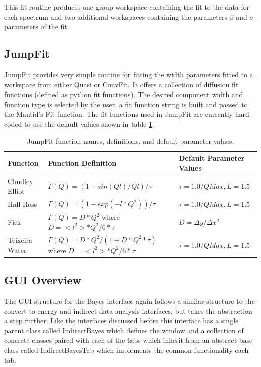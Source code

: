 \documentclass[paper=a4, fontsize=11pt]{scrartcl}	%
\numberwithin{equation}{section}															%
\numberwithin{figure}{section}																%
\numberwithin{table}{section}																%
\begin{document}
This fit routine produces one group workspace containing the fit to the data for each spectrum and two additional workspaces containing the parameters $\beta$ and $\sigma$ parameters of the fit.

\subsection{JumpFit}
\label{subsec:jumpfit}
JumpFit provides very simple routine for fitting the width parameters fitted to a workspace from either Quasi or ConvFit. It offers a collection of diffusion fit functions (defined as python fit functions). The desired component width and function type is selected by the user, a fit function string is built and passed to the Mantid's Fit function. The fit functions used in JumpFit are currently hard coded to use the default values shown in table \ref{table:jumpfit-functions}.

\begin{table}[H]
\begin{center}
\begin{tabular}{ l l l}
Function & Function Definition & Default Parameter Values \\ \hline
Chudley-Elliot &  $\Gamma(Q) = (1 - sin(Ql)/Ql)/\tau$ & $\tau = 1.0/QMax, L=1.5$\\ \hline
Hall-Ross & $\Gamma(Q) = (1-exp(-l*Q^2))/\tau$ & $\tau = 1.0/QMax, L=1.5$ \\ \hline
Fick & \parbox{6cm}{$\Gamma(Q) = D*Q^2$ \\ where $D=<l^2>*Q^2/6*\tau$} & $D = \Delta y / \Delta x^2$\\ \hline
Teixeira Water & \parbox{6cm}{$\Gamma(Q) = D*Q^2/(1 + D*Q^2*\tau)$ \\ where $D=<l^2>*Q^2/6*\tau$} & $\tau = 1.0/QMax, L=1.5$ \\ \hline
\end{tabular}
\caption{JumpFit function names, definitions, and default parameter values.}
\label{table:jumpfit-functions}
\end{center}
\end{table}

\subsection{GUI Overview}
\label{subsubsec:Bayes-GUI-Overview}
The GUI structure for the Bayes interface again follows a similar structure to the convert to energy and indirect data analysis interfaces, but takes the abstraction a step further. Like the interfaces discussed before this interface has a single parent class called IndirectBayes which defines the window and a collection of concrete classes paired with each of the tabs which inherit from an abstract base class called IndirectBayesTab which implements the common functionality each tab. 
\end{document}
